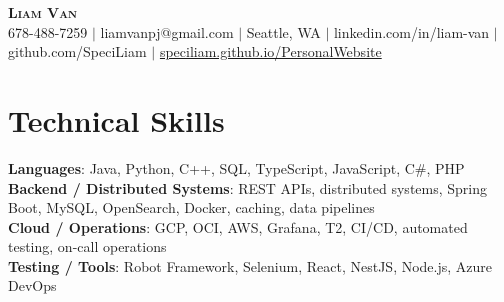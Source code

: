 \documentclass[letterpaper,11pt]{article}
\begin{document}

%
\begin{center}
    \textbf{\Huge \scshape Liam Van} \\ \vspace{1pt}
    \small 678-488-7259 $|$ \small {liamvanpj@gmail.com} $|$ Seattle, WA
 {{$|$ linkedin.com/in/liam-van} {$|$ github.com/SpeciLiam} {$|$ \href{https://speciliam.github.io/PersonalWebsite}{speciliam.github.io/PersonalWebsite}}}

\end{center}

\section{Technical Skills}
 \begin{itemize}[leftmargin=0.15in, label={}]
    \small{\item{
     \textbf{Languages}{: Java, Python, C++, SQL, TypeScript, JavaScript, C\#, PHP} \\
     \textbf{Backend / Distributed Systems}{: REST APIs, distributed systems, Spring Boot, MySQL, OpenSearch, Docker, caching, data pipelines} \\
     \textbf{Cloud / Operations}{: GCP, OCI, AWS, Grafana, T2, CI/CD, automated testing, on-call operations} \\
     \textbf{Testing / Tools}{: Robot Framework, Selenium, React, NestJS, Node.js, Azure DevOps} \\
    }}
 \end{itemize}
%
\end{document}
